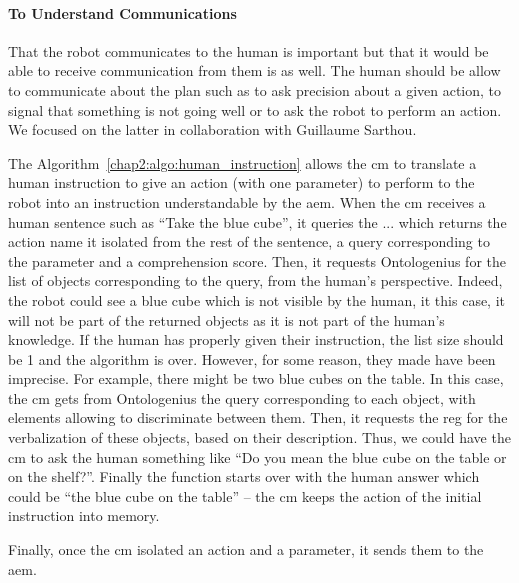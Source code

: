 \documentclass[a4paper,11pt,twoside]{StyleThese}
\begin{document}
\paragraph{To Understand Communications}
That the robot communicates to the human is important but that it would be able to receive communication from them is as well. The human should be allow to communicate about the plan such as to ask precision about a given action, to signal that something is not going well or to ask the robot to perform an action. We focused on the latter in collaboration with Guillaume Sarthou. 

The Algorithm~\ref{chap2:algo:human_instruction} allows the \acrshort{cm} to translate a human instruction to give an action (with one parameter) to perform to the robot into an instruction understandable by the \acrlong{aem}. When the \acrshort{cm} receives a human sentence such as ``Take the blue cube'', it queries the ... which returns the action name it isolated from the rest of the sentence, a \sparql query corresponding to the parameter and a comprehension score. Then, it requests Ontologenius for the list of objects corresponding to the \sparql query, from the human's perspective. Indeed, the robot could see a blue cube which is not visible by the human, it this case, it will not be part of the returned objects as it is not part of the human's knowledge. If the human has properly given their instruction, the list size should be 1 and the algorithm is over. However, for some reason, they made have been imprecise. For example, there might be two blue cubes on the table. In this case, the \acrshort{cm} gets from Ontologenius the \sparql query corresponding to each object, with elements allowing to discriminate between them. Then, it requests the \acrshort{reg} for the verbalization of these objects, based on their \sparql description. Thus, we could have the \acrshort{cm} to ask the human something like ``Do you mean the blue cube on the table or on the shelf?''. Finally the function starts over with the human answer which could be ``the blue cube on the table'' -- the \acrshort{cm} keeps the action of the initial instruction into memory.

Finally, once the \acrshort{cm} isolated an action and a parameter, it sends them to the \acrlong{aem}.
\end{document}
